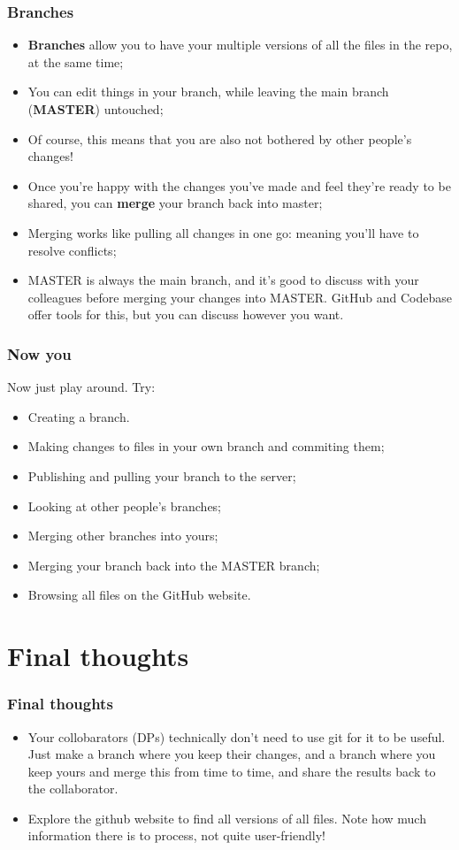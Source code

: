 \documentclass{beamer}
\begin{document}
\begin{frame}
	\frametitle{Branches}
	\begin{itemize}
		\item \textbf{Branches} allow you to have your multiple versions of all the files in the repo, at the same time;
		\item You can edit things in your branch, while leaving the main branch (\textbf{MASTER}) untouched;
		\item Of course, this means that you are also not bothered by other people's changes!
		\item Once you're happy with the changes you've made and feel they're ready to be shared, you can \textbf{merge} your branch back into master;
		\item Merging works like pulling all changes in one go: meaning you'll have to resolve conflicts;
		\item MASTER is always the main branch, and it's good to discuss with your colleagues before merging your changes into MASTER. GitHub and Codebase offer tools for this, but you can discuss however you want.
	\end{itemize}
\end{frame}


\begin{frame}
	\frametitle{Now you}
	Now just play around. Try:
	\begin{itemize}
		\item Creating a branch.
		\item Making changes to files in your own branch and commiting them;
		\item Publishing and pulling your branch to the server;
		\item Looking at other people's branches;
		\item Merging other branches into yours;
		\item Merging your branch back into the MASTER branch;
		\item Browsing all files on the GitHub website.
	\end{itemize}
\end{frame}

\section{Final thoughts}

\begin{frame}
	\frametitle{Final thoughts}
	\begin{itemize}
		\item Your collobarators (DPs) technically don't need to use git for it to be useful. Just make a branch where you keep their changes, and a branch where you keep yours and merge this from time to time, and share the results back to the collaborator.
		\item Explore the github website to find all versions of all files. Note how much information there is to process, not quite user-friendly!
	\end{itemize}
\end{frame}
\end{document}
